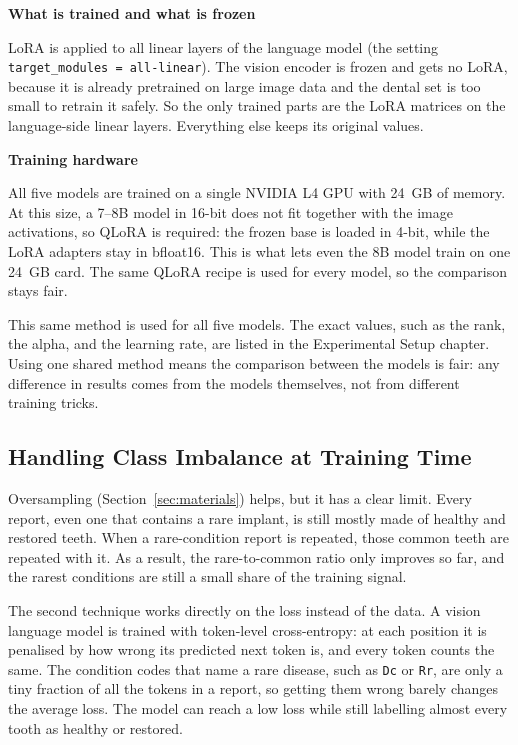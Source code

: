 \documentclass[a4paper,12pt]{report}
\newcommand{\minisection}[1]{%
  \vspace{1ex}
  \noindent\textbf{#1}\par
  \vspace{0.5ex}
}
\begin{document}
\minisection{What is trained and what is frozen}

LoRA is applied to all linear layers of the language model (the setting \texttt{target\_modules = all-linear}). The vision encoder is frozen and gets no LoRA, because it is already pretrained on large image data and the dental set is too small to retrain it safely. So the only trained parts are the LoRA matrices on the language-side linear layers. Everything else keeps its original values.

\minisection{Training hardware}

All five models are trained on a single NVIDIA L4 GPU with 24~GB of memory. At this size, a 7--8B model in 16-bit does not fit together with the image activations, so QLoRA is required: the frozen base is loaded in 4-bit, while the LoRA adapters stay in bfloat16. This is what lets even the 8B model train on one 24~GB card. The same QLoRA recipe is used for every model, so the comparison stays fair.

This same method is used for all five models. The exact values, such as the rank, the alpha, and the learning rate, are listed in the Experimental Setup chapter. Using one shared method means the comparison between the models is fair: any difference in results comes from the models themselves, not from different training tricks.

\subsection{Handling Class Imbalance at Training Time}
\label{sec:loss-weighting}

Oversampling (Section~\ref{sec:materials}) helps, but it has a clear limit. Every report, even one that contains a rare implant, is still mostly made of healthy and restored teeth. When a rare-condition report is repeated, those common teeth are repeated with it. As a result, the rare-to-common ratio only improves so far, and the rarest conditions are still a small share of the training signal.

The second technique works directly on the loss instead of the data. A vision language model is trained with token-level cross-entropy: at each position it is penalised by how wrong its predicted next token is, and every token counts the same. The condition codes that name a rare disease, such as \texttt{Dc} or \texttt{Rr}, are only a tiny fraction of all the tokens in a report, so getting them wrong barely changes the average loss. The model can reach a low loss while still labelling almost every tooth as healthy or restored.
\end{document}
